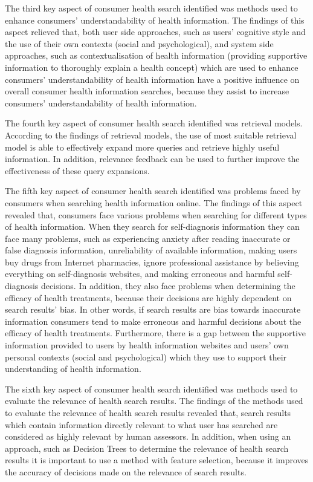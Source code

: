 \documentclass[]{article}
\begin{document}
The third key aspect of consumer health search identified was methods used to enhance consumers' understandability of health information. The findings of this aspect relieved that, both user side approaches, such as users’ cognitive style and the use of their own contexts (social and psychological), and system side approaches, such as contextualisation of health information (providing supportive information to thoroughly explain a health concept) which are used to enhance consumers’ understandability of health information have a positive influence on overall consumer health information searches, because they assist to increase consumers’ understandability of health information.

The fourth key aspect of consumer health search identified was retrieval models. According to the findings of retrieval models, the use of most suitable retrieval model is able to effectively expand more queries and retrieve highly useful information. In addition, relevance feedback can be used to further improve the effectiveness of these query expansions.

The fifth key aspect of consumer health search identified was problems faced by consumers when searching health information online. The findings of this aspect revealed that, consumers face various problems when searching for different types of health information. When they search for self-diagnosis information they can face many problems, such as experiencing anxiety after reading inaccurate or false diagnosis information, unreliability of available information, making users buy drugs from Internet pharmacies, ignore professional assistance by believing everything on self-diagnosis websites, and making erroneous and harmful self-diagnosis decisions. In addition, they also face problems when determining the efficacy of health treatments, because their decisions are highly dependent on search results' bias. In other words, if search results are bias towards inaccurate information consumers tend to make erroneous and harmful decisions about the efficacy of health treatments. Furthermore, there is a gap between the supportive information provided to users by health information websites and users' own personal contexts (social and psychological) which they use to support their understanding of health information.  

The sixth key aspect of consumer health search identified was methods used to evaluate the relevance of health search results. The findings of the methods used to evaluate the relevance of health search results revealed that, search results which contain information directly relevant to what user has searched are considered as highly relevant by human assessors. In addition, when using an approach, such as Decision Trees to determine the relevance of health search results it is important to use a method with feature selection, because it improves the accuracy of decisions made on the relevance of search results.
\end{document}
